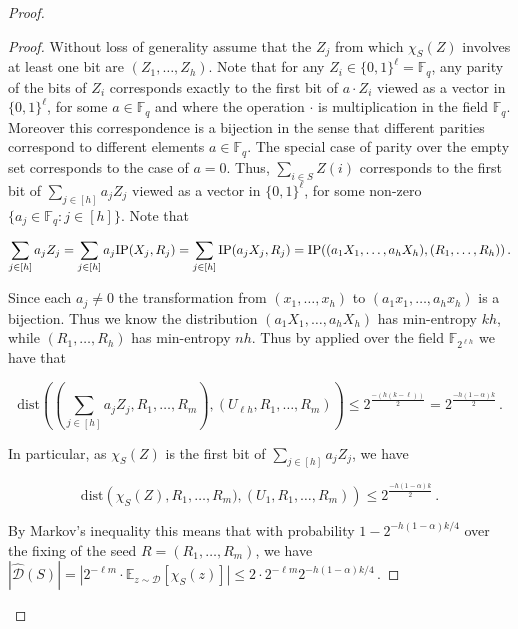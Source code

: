 \documentclass{toc}
\def\E{\mathbb{E}}
\def\dist{\mathrm{dist}}
\newcommand{\IP}{\textnormal{IP}}
\newcommand{\F}{\mathbb{F}}
\newcommand{\calD}{\mathcal{D}} %
\begin{document}
\begin{proof}
\begin{proof}
Without loss of generality assume that the 
%
$Z_j$   %
from which $\chi_S(Z)$ involves at least one bit are $(Z_1, \ldots, Z_h)$. Note that
for any $Z_i \in \{0, 1\}^{\ell}=\F_q$, any parity of the bits of $Z_i$ corresponds exactly to the first bit of $a \cdot Z_i$ viewed as a vector in
$\{0, 1\}^{\ell}$, for some $a \in \F_q$ and where the operation $\cdot$ is multiplication in the field $\F_q$. Moreover this correspondence is a bijection
in the sense that different parities correspond to different elements $a \in \F_q$. The special case of parity over the empty set corresponds to the
case of $a=0$. Thus, $\sum_{i \in S} Z(i)$ corresponds to the first bit of $\sum_{j \in [h]} a_j Z_j$ viewed as a vector in $\{0, 1\}^{\ell}$, for
some non-zero $\{a_j \in \F_q: j \in [h]\}$. Note that

\begin{equation}
\sum_{j \in [h]} a_j Z_j =\sum_{j \in [h]} a_j \IP(X_j, R_j)=\sum_{j \in [h]}  \IP( a_j X_j, R_j)=\IP((a_1 X_1, \ldots, a_h X_h), (R_1, \ldots,
R_h))\,.
\end{equation}

Since each $a_j \neq 0$ the transformation from $(x_1, \ldots, x_h)$ to $(a_1 x_1, \ldots, a_h x_h)$ is a bijection. Thus we know the distribution
$(a_1 X_1, \ldots, a_h X_h)$ has min-entropy $kh$, while $(R_1, \ldots, R_h)$ has min-entropy $nh$. Thus by  applied over the
field $\F_{2^{\ell h}}$ we have that

\begin{equation}
\dist\left((\sum_{j \in [h]} a_j Z_j, R_1, \ldots, R_m),(U_{\ell h}, R_1, \ldots, R_m)\right)\leq
2^{\frac{-(h(k-\ell))}{2}}=2^{\frac{-h(1-\alpha)k}{2}}\,.
\end{equation}
%

In particular, as $\chi_S(Z)$ is the first bit of $\sum_{j \in [h]} a_j Z_j$, we have

\begin{equation}
\dist\left(\chi_S(Z), R_1, \ldots, R_m),(U_1, R_1, \ldots, R_m)\right)\leq 2^{\frac{-h(1-\alpha)k}{2}}\,.
\end{equation}
  
By Markov's inequality this means that with probability
%
$1-2^{-h(1-\alpha)k/4}$  %
over the fixing of the seed $R=(R_1,\ldots,R_m)$, we have
$|\hat{\calD}(S) |=|2^{-\ell m}\cdot \E_{z \sim {\calD}} [\chi_S(z)]| 
\leq 2 \cdot 2^{-\ell m} %
2^{-h(1-\alpha)k/4}$\,.   %
\end{proof}


\end{proof}
\end{document}
